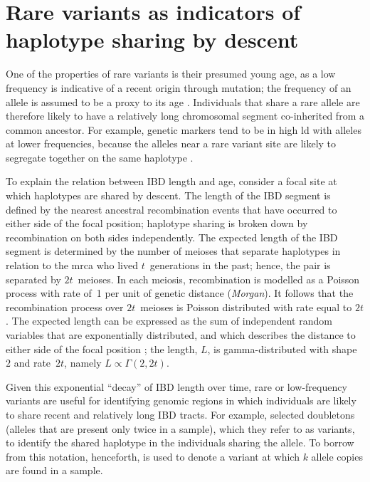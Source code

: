 %
\section{Rare variants as indicators of haplotype sharing by descent}
\label{sec:rarevars}
%

One of the properties of rare variants is their presumed young age, as a low frequency is indicative of a recent origin through mutation; \ie the frequency of an allele is assumed to be a proxy to its age \citep{Kimura:1973ug,Griffiths:2013ec}.
Individuals that share a rare allele are therefore likely to have a relatively long chromosomal segment co-inherited from a common ancestor.
For example, genetic markers tend to be in high \gls{ld} with alleles at lower frequencies, because the alleles near a rare variant site are likely to segregate together on the same haplotype \citep{Kruglyak:1999dp,Slatkin:2008ks}.

To explain the relation between IBD length and age, consider a focal site at which  haplotypes are shared by descent.
The length of the IBD segment is defined by the nearest ancestral recombination events that have occurred to either side of the focal position; \ie haplotype sharing is broken down by recombination on both sides independently.
The expected length of the IBD segment is determined by the number of meioses that separate  haplotypes in relation to the \gls{mrca} who lived $t$~generations in the past; hence, the pair is separated by ${2 t}$~meioses.
In each meiosis, recombination is modelled as a Poisson process with rate of~1 per unit of genetic distance (\emph{Morgan}).
It follows that the recombination process over ${2 t}$~meioses is Poisson distributed with rate equal to ${2 t}$.
The expected length can be expressed as the sum of  independent random variables that are exponentially distributed, and which describes the distance to either side of the focal position \citep[see][]{Wakeley2016book}; \ie the length, $L$, is gamma-distributed with shape~$2$ and rate~${2 t}$, namely ${L \propto \Gamma(2, 2 t)}$.

%

%

Given this exponential ``decay'' of IBD length over time, rare or low-frequency variants are useful for identifying genomic regions in which individuals are likely to share recent and relatively long IBD tracts.
For example, \citet{Mathieson:2014ig} selected doubletons (alleles that are present only twice in a sample), which they refer to as  variants, to identify the shared haplotype in the  individuals sharing the allele.
To borrow from this notation, henceforth, \fk{} is used to denote a variant at which $k$ allele copies are found in a sample.

